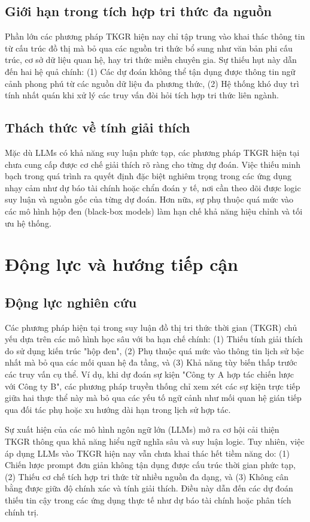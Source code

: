 \subsection{Giới hạn trong tích hợp tri thức đa nguồn}
Phần lớn các phương pháp TKGR hiện nay chỉ tập trung vào khai thác thông tin từ cấu trúc đồ thị mà bỏ qua các nguồn tri thức bổ sung như văn bản phi cấu trúc, cơ sở dữ liệu quan hệ, hay tri thức miền chuyên gia. Sự thiếu hụt này dẫn đến hai hệ quả chính: (1) Các dự đoán không thể tận dụng được thông tin ngữ cảnh phong phú từ các nguồn dữ liệu đa phương thức, (2) Hệ thống khó duy trì tính nhất quán khi xử lý các truy vấn đòi hỏi tích hợp tri thức liên ngành.

\subsection{Thách thức về tính giải thích}
Mặc dù LLMs có khả năng suy luận phức tạp, các phương pháp TKGR hiện tại chưa cung cấp được cơ chế giải thích rõ ràng cho từng dự đoán. Việc thiếu minh bạch trong quá trình ra quyết định đặc biệt nghiêm trọng trong các ứng dụng nhạy cảm như dự báo tài chính hoặc chẩn đoán y tế, nơi cần theo dõi được logic suy luận và nguồn gốc của từng dự đoán. Hơn nữa, sự phụ thuộc quá mức vào các mô hình hộp đen (black-box models) làm hạn chế khả năng hiệu chỉnh và tối ưu hệ thống.


\section{Động lực và hướng tiếp cận}

\subsection{Động lực nghiên cứu}
Các phương pháp hiện tại trong suy luận đồ thị tri thức thời gian (TKGR) chủ yếu dựa trên các mô hình học sâu với ba hạn chế chính: (1) Thiếu tính giải thích do sử dụng kiến trúc "hộp đen", (2) Phụ thuộc quá mức vào thông tin lịch sử bậc nhất mà bỏ qua các mối quan hệ đa tầng, và (3) Khả năng tùy biến thấp trước các truy vấn cụ thể. Ví dụ, khi dự đoán sự kiện "Công ty A hợp tác chiến lược với Công ty B", các phương pháp truyền thống chỉ xem xét các sự kiện trực tiếp giữa hai thực thể này mà bỏ qua các yếu tố ngữ cảnh như mối quan hệ gián tiếp qua đối tác phụ hoặc xu hướng dài hạn trong lịch sử hợp tác.

Sự xuất hiện của các mô hình ngôn ngữ lớn (LLMs) mở ra cơ hội cải thiện TKGR thông qua khả năng hiểu ngữ nghĩa sâu và suy luận logic. Tuy nhiên, việc áp dụng LLMs vào TKGR hiện nay vẫn chưa khai thác hết tiềm năng do: (1) Chiến lược prompt đơn giản không tận dụng được cấu trúc thời gian phức tạp, (2) Thiếu cơ chế tích hợp tri thức từ nhiều nguồn đa dạng, và (3) Không cân bằng được giữa độ chính xác và tính giải thích. Điều này dẫn đến các dự đoán thiếu tin cậy trong các ứng dụng thực tế như dự báo tài chính hoặc phân tích chính trị.

